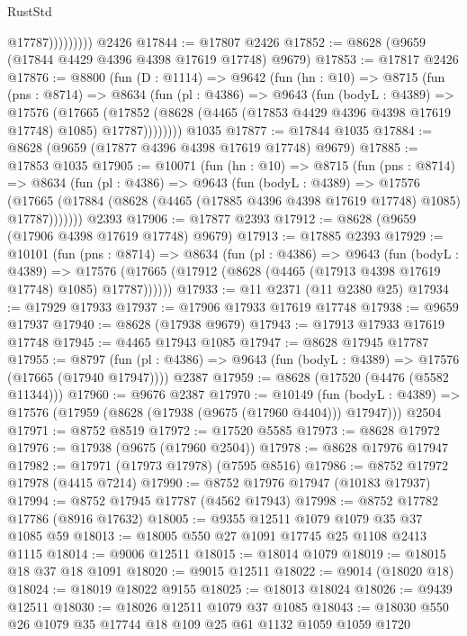 \begin{lexlean}{RustStd}
\begin{coremodule}
                      @17787)))))))))
    @2426
@17844 := @17807 @2426
@17852 := @8628 (@9659 (@17844 @4429 @4396 @4398 @17619 @17748) @9679)
@17853 := @17817 @2426
@17876 := @8800
    (fun (D : @1114) =>
    @9642
      (fun (hn : @10) =>
      @8715
        (fun (pns : @8714) =>
        @8634
          (fun (pl : @4386) =>
          @9643
            (fun (bodyL : @4389) =>
            @17576
              (@17665
                (@17852 (@8628 (@4465 (@17853 @4429 @4396 @4398 @17619 @17748) @1085) @17787))))))))
    @1035
@17877 := @17844 @1035
@17884 := @8628 (@9659 (@17877 @4396 @4398 @17619 @17748) @9679)
@17885 := @17853 @1035
@17905 := @10071
    (fun (hn : @10) =>
    @8715
      (fun (pns : @8714) =>
      @8634
        (fun (pl : @4386) =>
        @9643
          (fun (bodyL : @4389) =>
          @17576
            (@17665 (@17884 (@8628 (@4465 (@17885 @4396 @4398 @17619 @17748) @1085) @17787)))))))
    @2393
@17906 := @17877 @2393
@17912 := @8628 (@9659 (@17906 @4398 @17619 @17748) @9679)
@17913 := @17885 @2393
@17929 := @10101
    (fun (pns : @8714) =>
    @8634
      (fun (pl : @4386) =>
      @9643
        (fun (bodyL : @4389) =>
        @17576 (@17665 (@17912 (@8628 (@4465 (@17913 @4398 @17619 @17748) @1085) @17787))))))
@17933 := @11 @2371 (@11 @2380 @25)
@17934 := @17929 @17933
@17937 := @17906 @17933 @17619 @17748
@17938 := @9659 @17937
@17940 := @8628 (@17938 @9679)
@17943 := @17913 @17933 @17619 @17748
@17945 := @4465 @17943 @1085
@17947 := @8628 @17945 @17787
@17955 := @8797
    (fun (pl : @4386) => @9643 (fun (bodyL : @4389) => @17576 (@17665 (@17940 @17947))))
    @2387
@17959 := @8628 (@17520 (@4476 (@5582 @11344)))
@17960 := @9676 @2387
@17970 := @10149
    (fun (bodyL : @4389) => @17576 (@17959 (@8628 (@17938 (@9675 (@17960 @4404))) @17947)))
    @2504
@17971 := @8752 @8519
@17972 := @17520 @5585
@17973 := @8628 @17972
@17976 := @17938 (@9675 (@17960 @2504))
@17978 := @8628 @17976 @17947
@17982 := @17971 (@17973 @17978) (@7595 @8516)
@17986 := @8752 @17972 @17978 (@4415 @7214)
@17990 := @8752 @17976 @17947 (@10183 @17937)
@17994 := @8752 @17945 @17787 (@4562 @17943)
@17998 := @8752 @17782 @17786 (@8916 @17632)
@18005 := @9355 @12511 @1079 @1079 @35 @37 @1085 @59
@18013 := @18005 @550 @27 @1091 @17745 @25 @1108 @2413 @1115
@18014 := @9006 @12511
@18015 := @18014 @1079
@18019 := @18015 @18 @37 @18 @1091
@18020 := @9015 @12511
@18022 := @9014 (@18020 @18)
@18024 := @18019 @18022 @9155
@18025 := @18013 @18024
@18026 := @9439 @12511
@18030 := @18026 @12511 @1079 @37 @1085
@18043 := @18030 @550 @26 @1079 @35 @17744 @18 @109 @25 @61 @1132 @1059 @1059 @1720

\end{coremodule}
\end{lexlean}
